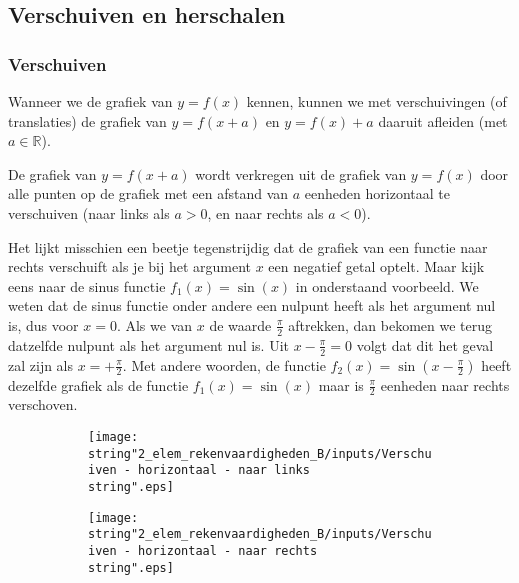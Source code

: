 

\subsection{Verschuiven en herschalen}


\subsubsection{Verschuiven}

Wanneer we de grafiek van $y=f(x)$ kennen, kunnen we met
verschuivingen (of translaties) de grafiek van $y=f(x+a)$ en $y=f(x)+a$
daaruit afleiden (met $a\in\mathbb{R}$).

De grafiek van $y=f(x+a)$ wordt verkregen uit de grafiek
van $y=f(x)$ door alle punten op de grafiek met een afstand van $a$
eenheden horizontaal te verschuiven (naar links als $a>0$, en naar
rechts als $a<0$).

Het lijkt misschien een beetje tegenstrijdig dat de grafiek
van een functie naar rechts verschuift als je bij het argument $x$
een negatief getal optelt. Maar kijk eens naar de sinus functie $f_{1}(x)=\sin(x)$
in onderstaand voorbeeld. We weten dat de sinus functie onder andere
een nulpunt heeft als het argument nul is, dus voor $x=0$. Als we
van $x$ de waarde $\frac{\pi}{2}$ aftrekken, dan bekomen we terug
datzelfde nulpunt als het argument nul is. Uit $x-\frac{\pi}{2}=0$
volgt dat dit het geval zal zijn als $x=+\frac{\pi}{2}$. Met andere
woorden, de functie $f_{2}(x)=\sin(x-\frac{\pi}{2})$ heeft dezelfde
grafiek als de functie $f_{1}(x)=\sin(x)$ maar is $\frac{\pi}{2}$
eenheden naar rechts verschoven.


\begin{figure}[h]
	\centering
	\begin{subfigure}{.48\linewidth}
	\texttt{[image: \\string"2\_elem\_rekenvaardigheden\_B/inputs/Verschuiven - horizontaal - naar links\\string".eps]}
	\end{subfigure}
	\begin{subfigure}{.48\linewidth}
	 \texttt{[image: \\string"2\_elem\_rekenvaardigheden\_B/inputs/Verschuiven - horizontaal - naar rechts\\string".eps]} 
	\end{subfigure}
\end{figure}

